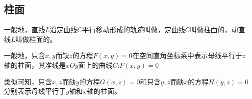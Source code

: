 \subsection{柱面}

一般地，直线$L$沿定曲线$C$平行移动形成的轨迹叫做，定曲线$C$叫做柱面的，动直线$L$叫做柱面的。
\par 一般地，只含$x,y$而缺$z$的方程$F(x,y)=0$在空间直角坐标系中表示母线平行于$z$轴的柱面，其准线是$xOy$面上的曲线$C$:$F(x,y)=0$
\par 类似可知，只含$x,z$而缺$y$的方程$G(x,z)=0$和只含$y,z$而缺$x$的方程$H(y,z)=0$分别表示母线平行于$y$轴和$x$轴的柱面。